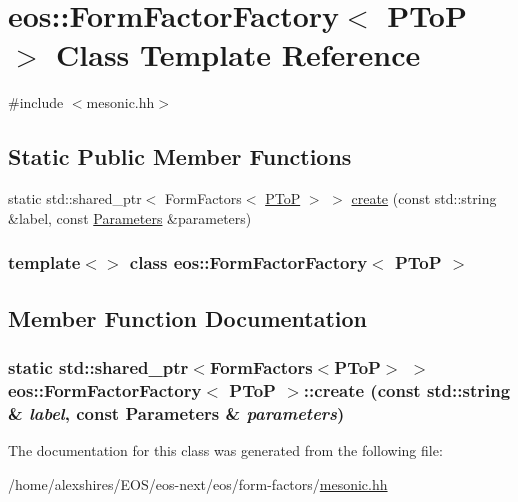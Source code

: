 \hypertarget{classeos_1_1FormFactorFactory_3_01PToP_01_4}{
\section{eos::FormFactorFactory$<$ PToP $>$ Class Template Reference}
\label{classeos_1_1FormFactorFactory_3_01PToP_01_4}
}


{\ttfamily \#include $<$mesonic.hh$>$}\subsection*{Static Public Member Functions}
\begin{DoxyCompactItemize}
\item 
static std::shared\_\-ptr$<$ FormFactors$<$ \hyperlink{structeos_1_1PToP}{PToP} $>$ $>$ \hyperlink{classeos_1_1FormFactorFactory_3_01PToP_01_4_a1160df83b7b2f9e349a119fa3d77d50a}{create} (const std::string \&label, const \hyperlink{classeos_1_1Parameters}{Parameters} \&parameters)
\end{DoxyCompactItemize}
\subsubsection*{template$<$$>$ class eos::FormFactorFactory$<$ PToP $>$}



\subsection{Member Function Documentation}
\hypertarget{classeos_1_1FormFactorFactory_3_01PToP_01_4_a1160df83b7b2f9e349a119fa3d77d50a}{
\subsubsection[{create}]{\setlength{\rightskip}{0pt plus 5cm}static std::shared\_\-ptr$<$FormFactors$<${\bf PToP}$>$ $>$ eos::FormFactorFactory$<$ {\bf PToP} $>$::create (const std::string \& {\em label}, \/  const {\bf Parameters} \& {\em parameters})}}
\label{classeos_1_1FormFactorFactory_3_01PToP_01_4_a1160df83b7b2f9e349a119fa3d77d50a}


The documentation for this class was generated from the following file:\begin{DoxyCompactItemize}
\item 
/home/alexshires/EOS/eos-\/next/eos/form-\/factors/\hyperlink{mesonic_8hh}{mesonic.hh}\end{DoxyCompactItemize}
